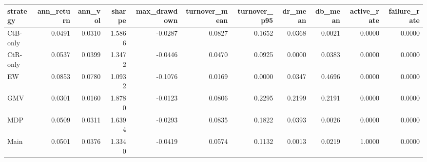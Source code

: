 \begin{tabular}{lrrrrrrrrrr}
\toprule
strategy & ann_return & ann_vol & sharpe & max_drawdown & turnover_mean & turnover_p95 & dr_mean & db_mean & active_rate & failure_rate \\
\midrule
CtB-only & 0.0491 & 0.0310 & 1.5866 & -0.0287 & 0.0827 & 0.1652 & 0.0368 & 0.0021 & 0.0000 & 0.0000 \\
CtR-only & 0.0537 & 0.0399 & 1.3472 & -0.0446 & 0.0470 & 0.0925 & 0.0000 & 0.0383 & 0.0000 & 0.0000 \\
EW & 0.0853 & 0.0780 & 1.0932 & -0.1076 & 0.0169 & 0.0000 & 0.0347 & 0.4696 & 0.0000 & 0.0000 \\
GMV & 0.0301 & 0.0160 & 1.8780 & -0.0123 & 0.0806 & 0.2295 & 0.2199 & 0.2191 & 0.0000 & 0.0000 \\
MDP & 0.0509 & 0.0311 & 1.6394 & -0.0293 & 0.0835 & 0.1822 & 0.0393 & 0.0026 & 0.0000 & 0.0000 \\
Main & 0.0501 & 0.0376 & 1.3340 & -0.0419 & 0.0574 & 0.1132 & 0.0013 & 0.0219 & 1.0000 & 0.0000 \\
\bottomrule
\end{tabular}
